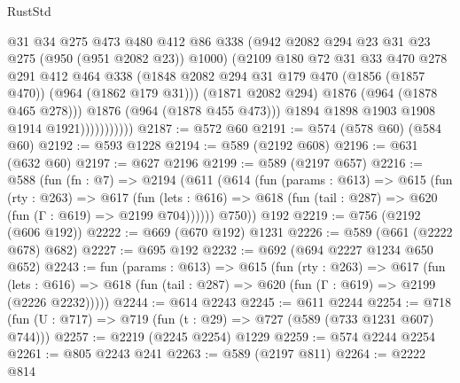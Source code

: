 \begin{lexlean}{RustStd}
\begin{coremodule}
{\begin{coremodule}
{{{{{{{{{                            @31
                            @34
                            @275
                            @473
                            @480
                            @412
                            @86
                            @338
                            (@942 @2082 @294 @23 @31 @23 @275 (@950 (@951 @2082 @23)) @1000)
                            (@2109
                              @180
                              @72
                              @31
                              @33
                              @470
                              @278
                              @291
                              @412
                              @464
                              @338
                              (@1848
                                @2082
                                @294
                                @31
                                @179
                                @470
                                (@1856 (@1857 @470))
                                (@964 (@1862 @179 @31)))
                              (@1871 @2082 @294)
                              @1876
                              (@964 (@1878 @465 @278)))
                            @1876
                            (@964 (@1878 @455 @473)))
                          @1894
                          @1898
                          @1903
                          @1908
                          @1914
                          @1921)))))))))))
@2187 := @572 @60
@2191 := @574 (@578 @60) (@584 @60)
@2192 := @593 @1228
@2194 := @589 (@2192 @608)
@2196 := @631 (@632 @60)
@2197 := @627 @2196
@2199 := @589 (@2197 @657)
@2216 := @588
    (fun (fn : @7) =>
    @2194
      (@611
        (@614
          (fun (params : @613) =>
          @615
            (fun (rty : @263) =>
            @617
              (fun (lets : @616) =>
              @618 (fun (tail : @287) => @620 (fun (Γ : @619) => @2199 @704))))))
        @750))
    @192
@2219 := @756 (@2192 (@606 @192))
@2222 := @669 (@670 @192) @1231
@2226 := @589 (@661 (@2222 @678) @682)
@2227 := @695 @192
@2232 := @692 (@694 @2227 @1234 @650 @652)
@2243 := fun (params : @613) =>
  @615
    (fun (rty : @263) =>
    @617
      (fun (lets : @616) =>
      @618 (fun (tail : @287) => @620 (fun (Γ : @619) => @2199 (@2226 @2232)))))
@2244 := @614 @2243
@2245 := @611 @2244
@2254 := @718 (fun (U : @717) => @719 (fun (t : @29) => @727 (@589 (@733 @1231 @607) @744)))
@2257 := @2219 (@2245 @2254) @1229
@2259 := @574 @2244 @2254
@2261 := @805 @2243 @241
@2263 := @589 (@2197 @811)
@2264 := @2222 @814
}}}}}}}}}
\end{coremodule}}
\end{coremodule}
\end{lexlean}
